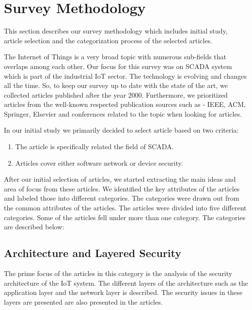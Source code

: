\documentclass[letterpaper, 10 pt, conference]{ieeeconf}  %
\begin{document}
\section{Survey Methodology}
This section describes our survey methodology which includes initial study, article selection and the categorization process of the selected articles.

The Internet of Things is a very broad topic with numerous sub-fields that overlaps among each other. Our focus for this survey was on SCADA system which is part of the industrial IoT sector. The technology is evolving and changes all the time. So, to keep our survey up to date with the state of the art, we collected articles published after the year 2000. Furthermore, we prioritized articles from the well-known respected publication sources such as - IEEE, ACM, Springer, Elsevier and conferences related to the topic when looking for articles. 

In our initial study we primarily decided to select article based on two criteria:
\begin{enumerate}
\item The article is specifically related the field of SCADA.
\item Articles cover either software network or device security.

\end{enumerate}

After our initial selection of articles, we started extracting the main ideas and area of focus from these articles. We identified the key attributes of the articles and labeled those into different categories. The categories were drawn out from the common attributes of the articles. The articles were divided into five different categories. Some of the articles fell under more than one category. The categories are described below:

\subsection{Architecture and Layered Security}
The prime focus of the articles in this category is the analysis of the security architecture of the IoT system. The different layers of the architecture such as the application layer and the network layer is described. The security issues in these layers are presented are also presented in the articles.

\end{document}
